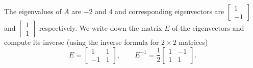 \documentclass{ximera}
\begin{document}
\begin{exampleSol}
    The eigenvalues of $A$ are $-2$ and 4 and corresponding eigenvectors are
    $\left[ \begin{smallmatrix}
        1 \\
        -1
    \end{smallmatrix} \right]$ 
    and
    $\left[ \begin{smallmatrix}
        1 \\
        1
    \end{smallmatrix} \right]$ 
    respectively. We write down the matrix $E$ of the eigenvectors and compute its inverse (using the inverse formula for $2 \times 2$ matrices)
    \begin{equation*}
        E = 
        \begin{bmatrix}
            1 & 1 \\
            -1 & 1
        \end{bmatrix} ,
        \qquad E^{-1} = \frac{1}{2}
        \begin{bmatrix}
            1 & -1 \\
            1 & 1
        \end{bmatrix} .
    \end{equation*}
    

\end{exampleSol}
\end{document}
